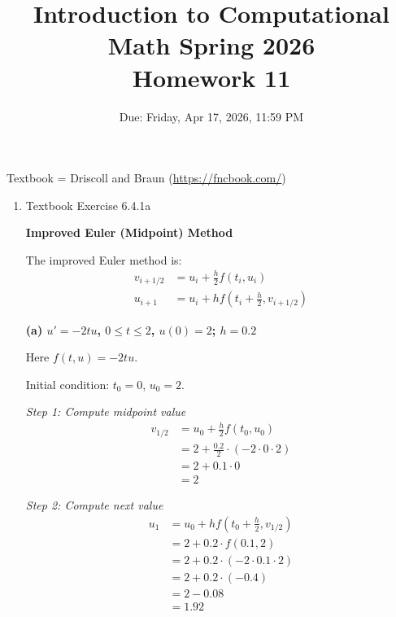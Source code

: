 \documentclass[reqno, answers]{exam}
\title{Introduction to Computational Math Spring 2026 \\ Homework 11}
\date{Due: Friday, Apr 17, 2026, 11:59 PM}
\author{}
\begin{document}
\maketitle
\thispagestyle{empty}

Textbook = Driscoll and Braun (\url{https://fncbook.com/})

\begin{enumerate}

  \item Textbook Exercise 6.4.1a
        \begin{solution}
          \textbf{Improved Euler (Midpoint) Method}

          The improved Euler method is:
          \begin{align*}
            v_{i+1/2} & = u_i + \frac{h}{2} f(t_i, u_i)                      \\
            u_{i+1}   & = u_i + h f\left(t_i + \frac{h}{2}, v_{i+1/2}\right)
          \end{align*}

          \medskip

          \textbf{(a) $u' = -2tu$, $0 \leq t \leq 2$, $u(0) = 2$; $h = 0.2$}

          Here $f(t,u) = -2tu$.

          Initial condition: $t_0 = 0$, $u_0 = 2$.

          \textit{Step 1: Compute midpoint value}
          \begin{align*}
            v_{1/2} & = u_0 + \frac{h}{2} f(t_0, u_0)                \\
                    & = 2 + \frac{0.2}{2} \cdot (-2 \cdot 0 \cdot 2) \\
                    & = 2 + 0.1 \cdot 0                              \\
                    & = 2
          \end{align*}

          \textit{Step 2: Compute next value}
          \begin{align*}
            u_1 & = u_0 + h f\left(t_0 + \frac{h}{2}, v_{1/2}\right) \\
                & = 2 + 0.2 \cdot f(0.1, 2)                          \\
                & = 2 + 0.2 \cdot (-2 \cdot 0.1 \cdot 2)             \\
                & = 2 + 0.2 \cdot (-0.4)                             \\
                & = 2 - 0.08                                         \\
                & = 1.92
          \end{align*}


\end{solution}
\end{enumerate}
\end{document}
